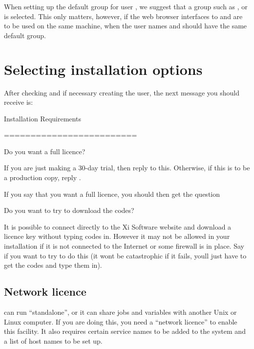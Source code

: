 {When setting up the default group for user \batchuser{}, we
suggest that a group such as , or
 is selected. This only matters, however, if the
web browser interfaces to \ProductName{} and \OtherProductName{} are to be used on the
same machine, when the user names \batchuser{} and
\spooluser{} should have the same default group.

\section{Selecting installation options}
After checking and if necessary creating the \batchuser{}
user, the next message you should receive is:

\begin{expara}

Installation Requirements

=========================

\bigskip

Do you want a full licence?

\end{expara}

If you are just making a 30-day trial, then reply 
to this. Otherwise, if this is to be a production copy, reply
.

If you say that you want a full licence, you should then get the
question

\begin{expara}

Do you want to try to download the codes?

\end{expara}

It is possible to connect directly to the Xi Software website and
download a licence key without typing codes in. However it may not be
allowed in your installation if it is not connected to the Internet or
some firewall is in place. Say  if you want to
try to do this (it won{\textquotesingle}t be catastrophic if it fails,
you{\textquotesingle}ll just have to get the codes and type them in).

\subsection[Network licence]{Network licence}
\ProductName{} can run {\textquotedblleft}standalone{\textquotedblright}, or
it can share jobs and variables with another Unix or Linux computer. If
you are doing this, you need a {\textquotedblleft}network
licence{\textquotedblright} to enable this facility. It also requires
certain service names to be added to the system and a list of host
names to be set up.

}
